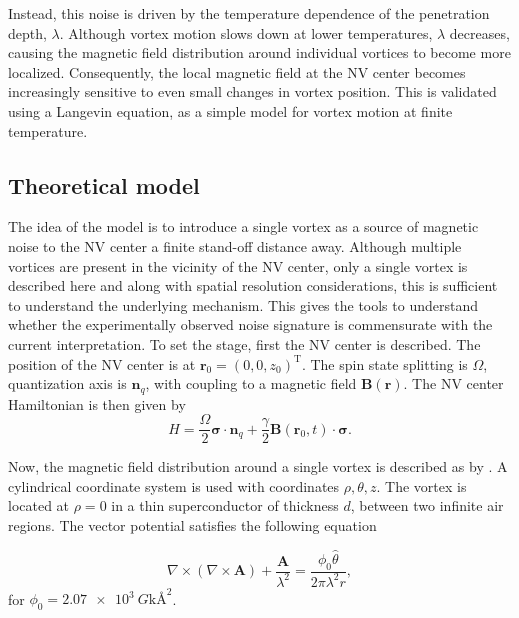 Instead, this noise is driven by the temperature dependence of the penetration depth, $\lambda$. Although vortex motion slows down at lower temperatures, $\lambda$ decreases, causing the magnetic field distribution around individual vortices to become more localized. Consequently, the local magnetic field at the \gls{NV} center becomes increasingly sensitive to even small changes in vortex position. This is validated using a Langevin equation, as a simple model for vortex motion at finite temperature.

\subsection*{Theoretical model\footnotemark}
The idea of the model is to introduce a single vortex as a source of magnetic noise to the \gls{NV} center a finite stand-off distance away. Although multiple vortices are present in the vicinity of the \gls{NV} center, only a single vortex is described here and along with spatial resolution considerations, this is sufficient to understand the underlying mechanism. This gives the tools to understand whether the experimentally observed noise signature is commensurate with the current interpretation. To set the stage, first the \gls{NV} center is described. The position of the \gls{NV} center is at $\mathbf{r}_0 = (0,0,z_0)^{\mathrm{T}}$. The spin state splitting is $\Omega$, quantization axis is $\mathbf{n}_q$, with coupling to a magnetic field $\mathbf{B(r)}$. The \gls{NV} center Hamiltonian is then given by
\begin{equation}
    H = \frac{\Omega}{2} \boldsymbol{\sigma} \cdot \mathbf{n}_q + \frac{\gamma}{2} \mathbf{B}(\mathbf{r}_0, t) \cdot \boldsymbol{\sigma}.
\end{equation}

Now, the magnetic field distribution around a single vortex is described as by \citeauthor*{kosslerMagneticFieldsVortices2012}. A cylindrical coordinate system is used with coordinates $\rho, \theta, z$. The vortex is located at $\rho = 0$ in a thin superconductor of thickness $d$, between two infinite air regions. The vector potential satisfies the following equation 

\begin{equation}
    \nabla \times (\nabla \times \mathbf{A}) + \frac{\mathbf{A}}{\lambda^2} = \frac{\phi_0 \hat{\theta}}{2\pi \lambda^2 r},
\end{equation}
for $\phi_0 = \qty{2.07e3}{G\kilo\angstrom\squared}$.

